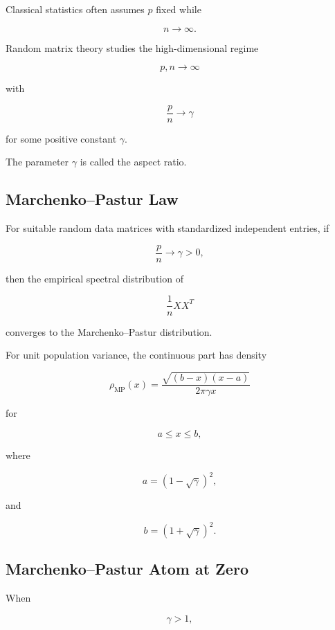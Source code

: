 Classical statistics often assumes \(p\) fixed while

\[
n\to\infty.
\]

Random matrix theory studies the high-dimensional regime

\[
\boxed{
p,n\to\infty
}
\]

with

\[
\boxed{
\frac pn
\to
\gamma
}
\]

for some positive constant \(\gamma\).

The parameter \(\gamma\) is called the aspect ratio.

\subsection{Marchenko--Pastur Law}
\label{subsec:marchenko-pastur-law}

\begin{theorem}
For suitable random data matrices with standardized independent entries,
if

\[
\frac pn\to\gamma>0,
\]

then the empirical spectral distribution of

\[
\frac1nXX^T
\]

converges to the Marchenko--Pastur distribution.
\end{theorem}

For unit population variance, the continuous part has density

\[
\boxed{
\rho_{\mathrm{MP}}(x)
=
\frac{
\sqrt{
(b-x)(x-a)
}
}{
2\pi\gamma x
}
}
\]

for

\[
a\leq x\leq b,
\]

where

\[
\boxed{
a=(1-\sqrt{\gamma})^2,
}
\]

and

\[
\boxed{
b=(1+\sqrt{\gamma})^2.
}
\]

\subsection{Marchenko--Pastur Atom at Zero}
\label{subsec:mp-atom-zero}

When

\[
\gamma>1,
\]

